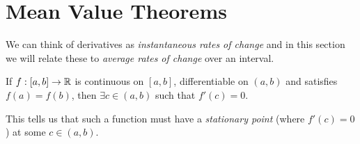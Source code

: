 \documentclass[../main.tex]{subfiles}
\begin{document}
\section{Mean Value Theorems}
We can think of derivatives as \textit{instantaneous rates of change} and in this section we will relate these to \textit{average rates of change} over an interval.
\begin{proposition}
  If $f: [a, b] \to \mathbb{R}$ is continuous on $[a, b]$, differentiable on $(a, b)$ and satisfies $f(a) = f(b)$, then $\exists c \in (a, b)$ such that $f'(c) = 0$.
  \label{rollesTheorem}
\end{proposition}
\begin{remark}[Intuition]
  This tells us that such a function must have a \textit{stationary point} (where $f'(c) = 0$) at some $c \in (a, b)$.
\end{remark}
\end{document}
